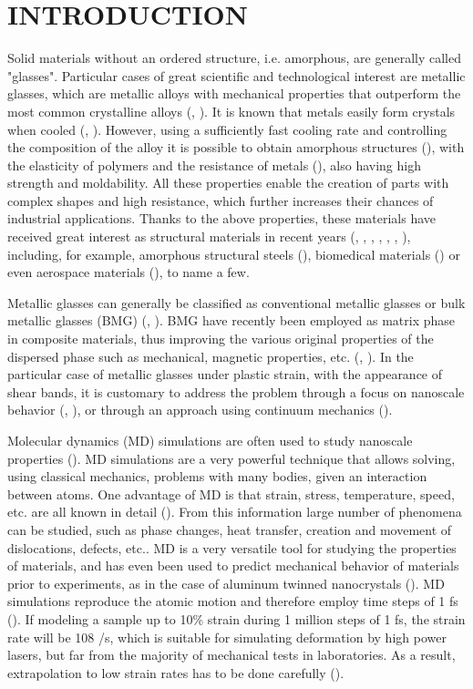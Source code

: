 \section{INTRODUCTION}
Solid materials without an ordered structure, i.e. amorphous, are generally called "glasses". Particular cases of great scientific and technological interest are metallic glasses, which are metallic alloys with mechanical properties that outperform the most common crystalline alloys (\cite{luborsky83}, \cite{greer95}). It is known that metals easily form crystals when cooled (\cite{callister95}, \cite{smith96}). However, using a sufficiently fast cooling rate and controlling the composition of the alloy it is possible to obtain amorphous structures (\cite{liebermann93}), with the elasticity of polymers and the resistance of metals (\cite{telford04}), also having high strength and moldability. All these properties enable the creation of parts with complex shapes and high resistance, which further increases their chances of industrial applications. Thanks to the above properties, these materials have received great interest as structural materials in recent years (\cite{chen74}, \cite{lowhaphandu99}, \cite{inoue00}, \cite{wang04}, \cite{ashby06}, \cite{zhang07}, \cite{schuh07}), including, for example, amorphous structural steels (\cite{lu04}), biomedical materials (\cite{zberg09}) or even aerospace materials (\cite{peker93}), to name a few.

Metallic glasses can generally be classified as conventional metallic glasses or bulk metallic glasses (BMG) (\cite{wang04}, \cite{miller07}). BMG have recently been employed as matrix phase in composite materials, thus improving the various original properties of the dispersed phase such as mechanical, magnetic properties, etc. (\cite{telford04}, \cite{lu11}). In the particular case of metallic glasses under plastic strain, with the appearance of shear bands, it is customary to address the problem through a focus on nanoscale behavior (\cite{ogata06}, \cite{guan10}), or through an approach using continuum mechanics (\cite{malvern69}).

Molecular dynamics (MD) simulations are often used to study nanoscale properties (\cite{allen87}). MD simulations are a very powerful technique that allows solving, using classical mechanics, problems with many bodies, given an interaction between atoms. One advantage of MD is that strain, stress, temperature, speed, etc. are all known in detail (\cite{allen87}). From this information large number of phenomena can be studied, such as phase changes, heat transfer, creation and movement of dislocations, defects, etc.. MD is a very versatile tool for studying the properties of materials, and has even been used to predict mechanical behavior of materials prior to  experiments, as in the case of aluminum twinned nanocrystals (\cite{chen03}). MD simulations reproduce the atomic motion and therefore employ time steps of 1 fs (\cite{allen87}). If modeling a sample up to 10\% strain during 1 million steps of 1 fs, the strain rate will be 108 /s, which is suitable for simulating deformation by high power lasers, but far from the majority of mechanical tests in laboratories. As a result, extrapolation to low strain rates has to be done carefully (\cite{bringa05}).

